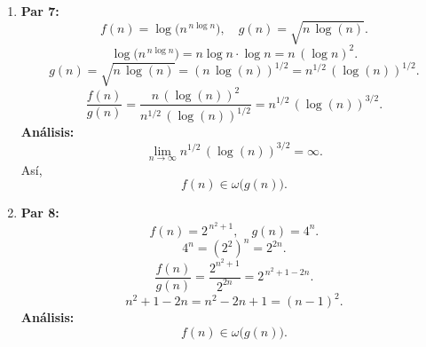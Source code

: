 \documentclass[12pt]{article}
\begin{document}
\begin{enumerate}
  \item \textbf{Par 7:}
  \[
    f(n) = \log\bigl(n^{\,n \log n}\bigr), \quad g(n) = \sqrt{n \,\log(n)}.
  \]
  \[
    \log\bigl(n^{\,n \log n}\bigr) = n \log n \cdot \log n = n\,(\log n)^2.
  \]
  \[
    g(n) = \sqrt{n\,\log(n)} = (n\,\log(n))^{1/2} = n^{1/2}\,(\log(n))^{1/2}.
  \]
  \[
    \frac{f(n)}{g(n)} = \frac{n\,(\log(n))^2}{n^{1/2}\,(\log(n))^{1/2}} = n^{1/2}\,(\log(n))^{3/2}.
  \]
  \textbf{Análisis:}
  \[
    \lim_{n \to \infty} n^{1/2}\,(\log(n))^{3/2} = \infty.
  \]
  Así,
  \[
    f(n) \in \omega\bigl(g(n)\bigr).
  \]

  \item \textbf{Par 8:}
  \[
    f(n) = 2^{\,n^2 + 1}, \quad g(n) = 4^n.
  \]
  \[
    4^n = (2^2)^n = 2^{2n}.
  \]
  \[
    \frac{f(n)}{g(n)} = \frac{2^{n^2+1}}{2^{2n}} = 2^{\,n^2 + 1 - 2n}.
  \]
  \[
    n^2 + 1 - 2n = n^2 - 2n + 1 = (n-1)^2.
  \]
  \textbf{Análisis:}
  \[
    f(n) \in \omega\bigl(g(n)\bigr).
  \]

\end{enumerate}
\end{document}

